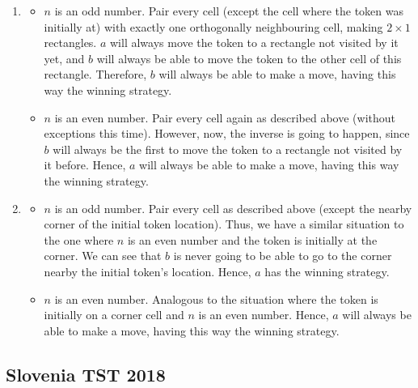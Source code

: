 \documentclass[12pt]{article}
\begin{document}
\begin{enumerate}
	Call $a$ and $b$ the two players, where $a$ moves first.
	\item
	      \begin{itemize}
		      \item $n$ is an odd number. Pair every cell (except the cell where the token was initially at) with exactly one orthogonally neighbouring cell, making $2\times1$ rectangles.
		            $a$ will always move the token to a rectangle not visited by it yet, and $b$ will always be able to move the token to the other cell of this rectangle.
		            Therefore, $b$ will always be able to make a move, having this way the winning strategy.
		      \item $n$ is an even number. Pair every cell again as described above (without exceptions this time). However, now, the inverse is going to happen, since $b$ will always be the first to move the token to a
		            rectangle not visited by it before. Hence, $a$ will always be able to make a move, having this way the winning strategy.
	      \end{itemize}
	\item
	      \begin{itemize}
		      \item $n$ is an odd number. Pair every cell as described above (except the nearby corner of the initial token location).
		            Thus, we have a similar situation to the one where $n$ is an even number and the token is initially at the corner.
		            We can see that $b$ is never going to be able to go to the corner nearby the initial token's location. Hence, $a$ has the winning strategy.
		      \item $n$ is an even number. Analogous to the situation where the token is initially on a corner cell and $n$ is an even number.
		            Hence, $a$ will always be able to make a move, having this way the winning strategy.
	      \end{itemize}

\end{enumerate}
\clearpage


\subsection{Slovenia TST 2018}
\end{document}

